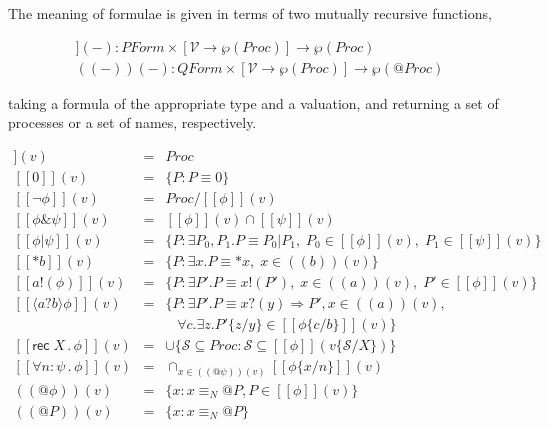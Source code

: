 \documentclass[]{amsart}
\makeatletter
\newcommand{\ldb}{[\![}
\newcommand{\rdb}{]\!]}
\newcommand{\ldrb}{(\!(}
\newcommand{\rdrb}{)\!)}
\newcommand{\id}[1]{\texttt{#1}}
\newcommand{\pzero}{\mathbin{0}}
\newcommand{\juxtap}{\mathbin{\id{|}}}
\newcommand{\concat}{\Rightarrow}
\newcommand{\scong}{\mathbin{\equiv}}
\newcommand{\nameeq}{\mathbin{\equiv_N}}
\newcommand{\binpar}[2]{#1 \juxtap #2}
\newcommand{\prefix}[3]{#1 ? ( #2 ) \concat #3}
\newcommand{\lift}[2]{#1 ! ( #2 )}
\newcommand{\quotep}[1]{@#1}
\newcommand{\dropn}[1]{*#1}
\newcommand{\substn}[2]{\id{\{} #1 / #2 \id{\}}}
\newcommand{\pmeaningof}[1]{\ldb #1 \rdb}
\newcommand{\nmeaningof}[1]{\ldrb #1 \rdrb}
\newcommand{\Proc}{\mathbin{Proc}}
\newcommand{\QProc}{\quotep{\mathbin{Proc}}}
\newcommand{\ptrue}{\mathbin{true}}
\newcommand{\pdropf}[1]{* #1}
\newcommand{\plift}[2]{#1 ! ( #2 )}
\newcommand{\pprefix}[3]{\langle #1 ? #2 \rangle #3}
\newcommand{\pgfp}[2]{\textsf{rec} \; #1 \mathbin{.} #2}
\newcommand{\pquant}[3]{\forall #1 \mathbin{:} #2 \mathbin{.} #3}
\newcommand{\PFormula}{\mathbin{PForm}}
\newcommand{\QFormula}{\mathbin{QForm}}
\newcommand{\PropVar}{\mathbin{\mathcal{V}}}
\theoremstyle{definition}
\theoremstyle{remark}
\numberwithin{equation}{subsection}
\makeatother
\begin{document}
The meaning of formulae is given in terms of two mutually recursive functions,

\begin{eqnarray}
\pmeaningof{ - }( - ) : \PFormula \times [\PropVar \to \wp(\Proc)] \to \wp(\Proc) \nonumber\\
\nmeaningof{ - }( - ) : \QFormula \times [\PropVar \to \wp(\Proc)] \to \wp(\QProc) \nonumber
\end{eqnarray}

taking a formula of the appropriate type and a valuation, and
returning a set of processes or a set of names, respectively.

\begin{eqnarray}
  \pmeaningof{\ptrue}(v) & = & \Proc \nonumber \\ 
  \pmeaningof{\pzero}(v) & = & \{ P : P \scong \pzero \} \nonumber \\ 
  \pmeaningof{\neg \phi}(v) & = & \Proc / \pmeaningof{\phi}(v) \nonumber\\
  \pmeaningof{\phi \& \psi}(v) & = & \pmeaningof{\phi}(v) \cap \pmeaningof{\psi}(v) \nonumber\\
  \pmeaningof{\binpar{\phi}{\psi}}(v) & = &
  \{ P : \exists P_0, P_1.P \scong \binpar{P_0}{P_1}, \; P_0 \in \pmeaningof{\phi}(v), \;  P_1 \in \pmeaningof{\psi}(v) \} \nonumber\\
  \pmeaningof{\pdropf{b}}(v) & = & \{ P : \exists x.P \scong {\dropn{x}}, \; x \in \nmeaningof{b}(v) \} \nonumber\\	
  \pmeaningof{\plift{a}{\phi}}(v) & = & \{ P : \exists P'.P \scong {\lift{x}{P'}},
                                           \; x \in \nmeaningof{a}(v), 
                                           \; P' \in \pmeaningof{\phi}(v) \} \nonumber\\
  \pmeaningof{\pprefix{a}{b}{\phi}}(v) & = & \{ P : \exists P'.P \scong {\prefix{x}{y}{P'}}, x \in \nmeaningof{a}(v), \nonumber\\
                                   &   &            \; \; \; \forall c . \exists z . {P'}\substn{z}{y} \in \pmeaningof{{\phi}\substn{c}{b}}(v) \} \nonumber\\
  \pmeaningof{\pgfp{X}{\phi}}(v) & = & \cup \{ \mathcal{S} \subseteq \Proc : \mathcal{S} \subseteq \pmeaningof{\phi}(v\substn{\mathcal{S}}{X})\} \nonumber\\
  \pmeaningof{\pquant{n}{\psi}{\phi}}(v) & = & \cap_{x \in \nmeaningof{\quotep{\psi}}(v)} \pmeaningof{{\phi}\substn{x}{n}}(v) \nonumber\\
  \nmeaningof{\quotep{\phi}}(v) & = & \{ x : x \nameeq \quotep{P}, P \in \pmeaningof{\phi}(v) \} \nonumber\\
  \nmeaningof{\quotep{P}}(v) & = & \{ x : x \nameeq  \quotep{P} \} \nonumber
\end{eqnarray}
\end{document}
